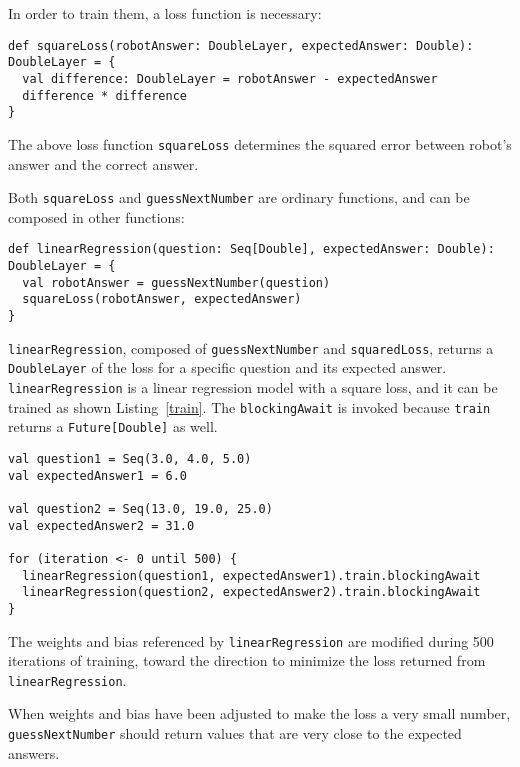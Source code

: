 In order to train them, a loss function is necessary:

\begin{lstlisting}[float={h t b p},caption={The differentiable square loss function},label={squareLoss}]
def squareLoss(robotAnswer: DoubleLayer, expectedAnswer: Double): DoubleLayer = {
  val difference: DoubleLayer = robotAnswer - expectedAnswer
  difference * difference
}
\end{lstlisting}

The above loss function \lstinline{squareLoss} determines the squared error between robot's answer and the correct answer.

Both \lstinline{squareLoss} and \lstinline{guessNextNumber} are ordinary functions, and can be composed in other functions:

\begin{lstlisting}[float={h t b p},caption={A differentiable function to train a linear regression model}]
def linearRegression(question: Seq[Double], expectedAnswer: Double): DoubleLayer = {
  val robotAnswer = guessNextNumber(question)
  squareLoss(robotAnswer, expectedAnswer)
}
\end{lstlisting}

\lstinline{linearRegression}, composed of \lstinline{guessNextNumber} and \lstinline{squaredLoss}, returns a \lstinline{DoubleLayer} of the loss for a specific question and its expected answer. \lstinline{linearRegression} is a linear regression model with a square loss, and it can be trained as shown Listing~\ref{train}. The \lstinline{blockingAwait} is invoked because \lstinline{train} returns a \lstinline{Future[Double]} as well.

\begin{lstlisting}[float={h t b p},caption={Training for 500 iterations},label={train}]
val question1 = Seq(3.0, 4.0, 5.0)
val expectedAnswer1 = 6.0

val question2 = Seq(13.0, 19.0, 25.0)
val expectedAnswer2 = 31.0

for (iteration <- 0 until 500) {
  linearRegression(question1, expectedAnswer1).train.blockingAwait
  linearRegression(question2, expectedAnswer2).train.blockingAwait
}
\end{lstlisting}

The weights and bias referenced by \lstinline{linearRegression} are modified during 500 iterations of training, toward the direction to minimize the loss returned from \lstinline{linearRegression}.

When weights and bias have been adjusted to make the loss a very small number, \lstinline{guessNextNumber} should return values that are very close to the expected answers.

